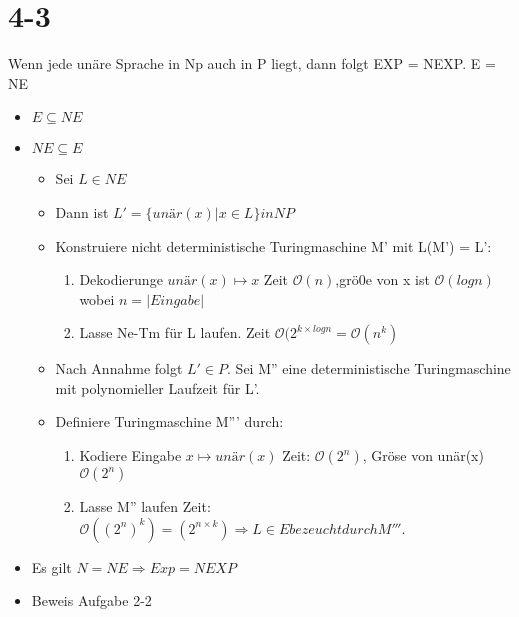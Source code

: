 \documentclass[12pt, oneside, a4paper, numbers=enddot, abstracton, parskip=full]{scrreprt}
\newcommand{\bigO}{\ensuremath{\mathcal{O}}}
\begin{document}
\section{4-3}
Wenn jede unäre Sprache in Np auch in P liegt, dann folgt EXP =
NEXP. E = NE

\begin{itemize}
\item $E\subseteq NE$
\item $NE \subseteq E$
  \begin{itemize}
  \item Sei $L \in NE$
  \item Dann ist $L' =\{unär(x) | x\in L\} in NP $
  \item Konstruiere nicht deterministische Turingmaschine M' mit L(M') = L':
  \begin{enumerate}
  \item Dekodierunge $unär(x) \mapsto x $ Zeit $\bigO (n)$,grö0e von x
    ist $ \bigO (log n) $ wobei $ n=|Eingabe|$
  \item Lasse Ne-Tm  für L laufen. Zeit $ \bigO (2^{k \times log n} = \bigO (n^k)$

  \end{enumerate}
  \item Nach Annahme folgt $L' \in P$. Sei M'' eine deterministische
    Turingmaschine mit polynomieller Laufzeit für L'.
  \item Definiere Turingmaschine M''' durch:
    \begin{enumerate}
    \item Kodiere Eingabe $x \mapsto unär(x)$  Zeit: $ \bigO (2^n)$,
      Gröse von unär(x) $ \bigO (2^n)$
    \item Lasse M'' laufen Zeit: $ \bigO ((2^n)^k) = (2^{n \times k})
      \Rightarrow L \in E bezeucht durch M'''.$
    \end{enumerate}
  \end{itemize}
\item Es gilt $N=NE \Rightarrow Exp = NEXP$
\item Beweis Aufgabe 2-2
\end{itemize}
\end{document}
